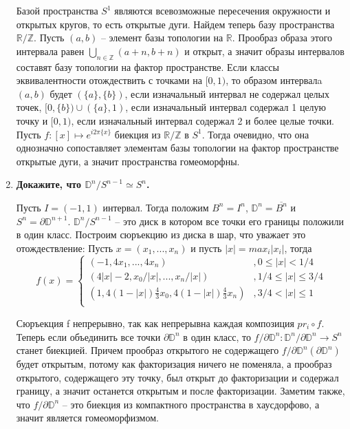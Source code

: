 \documentclass{article}
\begin{document}
\begin{enumerate}
        Базой пространства $S^1$ являются всевозможные пересечения окружности
        и открытых кругов, то есть открытые дуги. Найдем теперь базу
        пространства $\mathbb{R}/\mathbb{Z}$. Пусть $(a,b)$ – элемент базы
        топологии на $\mathbb{R}$. Прообраз образа этого интервала равен
        $\bigcup_{n\in\mathbb{Z}}(a+n,b+n)$ и открыт, а значит образы
        интервалов составят базу топологии на фактор пространстве. Если классы
        эквивалентности отождествить с точками на $[0,1)$, то образом
        интервалa $(a,b)$ будет $(\{a\},\{b\})$, если изначальный интервал не
        содержал целых точек, $[0,\{b\})\cup(\{a\},1)$, если изначальный
        интервал содержал 1 целую точку и $[0,1)$, если изначальный интервал
        содержал 2 и более целые точки. Пусть $f:[x]\mapsto e^{i2\pi\{x\}}$
        биекция из $\mathbb{R}/\mathbb{Z}$ в $S^1$. Тогда очевидно, что она
        однозначно сопоставляет элементам базы топологии на фактор пространстве
        открытые дуги, а значит пространства гомеоморфны.

    \item \textbf{Докажите, что $\mathbb{D}^n/S^{n−1}\simeq S^n$.}\par

        Пусть $I=(-1,1)$ интервал. Тогда положим $B^n=I^n$, $\mathbb{D}^n=
        \overline{B^n}$ и $S^n=\partial\mathbb{D}^{n+1}$. $\mathbb{D}^n/S^{n-1}$ –
        это диск в котором все точки его границы положили в один класс.
        Построим сюръекцию из диска в шар, что уважает это отождествление:
        Пусть $x=(x_1,...,x_n)$ и пусть $|x|=max_i|x_i|$, тогда
        \[f(x)=
        \begin{cases}
            (-1,4x_1,...,4x_n) &,0\leqslant|x|<1/4\\
            (4|x|-2,x_0/|x|,...,x_n/|x|) &,1/4\leqslant|x|\leqslant 3/4\\
            (1,4(1-|x|)\frac{4}{3}x_0,4(1-|x|)\frac{4}{3}x_n) &,3/4<|x|\leqslant1\\
        \end{cases}\]

        Сюръекция f непрерывно, так как непрерывна каждая композиция $pr_i
        \circ f$. Теперь если объединить все точки $\partial\mathbb{D}^n$ в
        один класс, то $f/\partial\mathbb{D}^n:\mathbb{D}^n/\partial\mathbb{D}^n
        \longrightarrow S^n$ станет биекцией. Причем прообраз открытого не
        содержащего $f/\partial\mathbb{D}^n(\partial\mathbb{D}^n)$ будет
        открытым, потому как факторизация ничего не поменяла, а прообраз
        открытого, содержащего эту точку, был открыт до факторизации и содержал
        границу, а значит останется открытым и после факторизации. Заметим
        также, что $f/\partial\mathbb{D}^n$ – это биекция из компактного
        пространства в хаусдорфово, а значит является гомеоморфизмом.


\end{enumerate}
\end{document}
